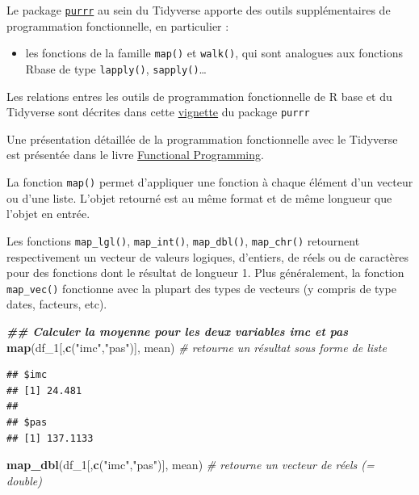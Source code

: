 \documentclass[
]{book}
\newenvironment{Shaded}{\begin{snugshade}}{\end{snugshade}}
\newcommand{\CommentTok}[1]{\textcolor[rgb]{0.56,0.35,0.01}{\textit{#1}}}
\newcommand{\DocumentationTok}[1]{\textcolor[rgb]{0.56,0.35,0.01}{\textbf{\textit{#1}}}}
\newcommand{\FunctionTok}[1]{\textcolor[rgb]{0.13,0.29,0.53}{\textbf{#1}}}
\newcommand{\NormalTok}[1]{#1}
\newcommand{\StringTok}[1]{\textcolor[rgb]{0.31,0.60,0.02}{#1}}
\providecommand{\tightlist}{%
  \setlength{\itemsep}{0pt}\setlength{\parskip}{0pt}}
\begin{document}
Le package \href{https://purrr.tidyverse.org/index.html}{\texttt{purrr}} au sein du Tidyverse apporte des outils supplémentaires de programmation fonctionnelle, en particulier :

\begin{itemize}
\tightlist
\item
  les fonctions de la famille \texttt{map()} et \texttt{walk()}, qui sont analogues aux fonctions Rbase de type \texttt{lapply()}, \texttt{sapply()}\ldots{}
\end{itemize}

Les relations entres les outils de programmation fonctionnelle de R base et du Tidyverse sont décrites dans cette \href{https://purrr.tidyverse.org/articles/base.html}{vignette} du package \texttt{purrr}

Une présentation détaillée de la programmation fonctionnelle avec le Tidyverse est présentée dans le livre \href{https://dcl-prog.stanford.edu/}{Functional Programming}.

La fonction \texttt{map()} permet d'appliquer une fonction à chaque élément d'un vecteur ou d'une liste. L'objet retourné est au même format et de même longueur que l'objet en entrée.

Les fonctions \texttt{map\_lgl()}, \texttt{map\_int()}, \texttt{map\_dbl()}, \texttt{map\_chr()} retournent respectivement un vecteur de valeurs logiques, d'entiers, de réels ou de caractères pour des fonctions dont le résultat de longueur 1. Plus généralement, la fonction \texttt{map\_vec()} fonctionne avec la plupart des types de vecteurs (y compris de type dates, facteurs, etc).

\begin{Shaded}
\begin{Highlighting}[]
\DocumentationTok{\#\# Calculer la moyenne pour les deux variables imc et pas}
\FunctionTok{map}\NormalTok{(df\_1[,}\FunctionTok{c}\NormalTok{(}\StringTok{"imc"}\NormalTok{,}\StringTok{"pas"}\NormalTok{)], mean) }\CommentTok{\# retourne un résultat sous forme de liste}
\end{Highlighting}
\end{Shaded}

\begin{verbatim}
## $imc
## [1] 24.481
## 
## $pas
## [1] 137.1133
\end{verbatim}

\begin{Shaded}
\begin{Highlighting}[]
\FunctionTok{map\_dbl}\NormalTok{(df\_1[,}\FunctionTok{c}\NormalTok{(}\StringTok{"imc"}\NormalTok{,}\StringTok{"pas"}\NormalTok{)], mean) }\CommentTok{\# retourne un vecteur de réels (= double)}
\end{Highlighting}
\end{Shaded}
\end{document}
